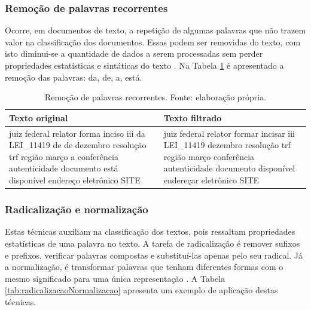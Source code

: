 \subsubsection{Remoção de palavras recorrentes}

Ocorre, em documentos de texto, a repetição de algumas palavras que não trazem valor na classificação dos documentos. Essas podem ser removidas do texto, com isto diminui-se a quantidade de dados a serem processadas sem perder propriedades estatísticas e sintáticas do texto \cite{MANNING2008}. Na Tabela \ref{tab:palavrasRecorrentes} é apresentado a remoção das palavras: da, de, a, está.

\begin{table}[h]
	\centering    
	\caption[Remoção de palavras recorrentes]{Remoção de palavras recorrentes. Fonte: elaboração própria.}
    \label{tab:palavrasRecorrentes}
	\begin{tabular}{|p{7cm}|p{7cm}|}
    \hline
    \textbf{Texto original} & \textbf{Texto filtrado}\\ \hline
	juiz federal relator forma inciso iii da LEI\_11419 de de dezembro resolução trf região março a conferência autenticidade documento está disponível endereço eletrônico SITE & juiz federal relator formar incisar iii LEI\_11419 dezembro resolução trf região março conferência autenticidade documento disponível endereçar eletrônico SITE
    \\ \hline
    \end{tabular}
\end{table}

\subsubsection{Radicalização e normalização}

Estas técnicas auxiliam na classificação dos textos, pois ressaltam propriedades estatísticas de uma palavra no texto. A tarefa de radicalização é remover sufixos e prefixos, verificar palavras compostas e substituí-las apenas pelo seu radical. Já a normalização, é transformar palavras que tenham diferentes formas com o mesmo significado para uma única representação \cite{SINGH2016}. A Tabela \ref{tab:radicalizacaoNormalizacao} apresenta um exemplo de aplicação destas técnicas.

